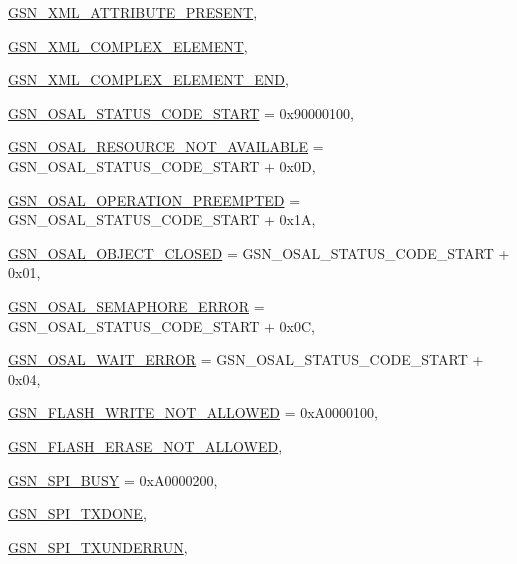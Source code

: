 \begin{DoxyCompactItemize}
\par
\hyperlink{a00659_gga476ae1caf992f8287176b2cc414c8707a73f0a3dccf9843f14a74761932fd6932}{GSN\_\-XML\_\-ATTRIBUTE\_\-PRESENT}, 
\par
\hyperlink{a00659_gga476ae1caf992f8287176b2cc414c8707a67b0a2de82e6b35ba5177aecd7a2f9fb}{GSN\_\-XML\_\-COMPLEX\_\-ELEMENT}, 
\par
\hyperlink{a00659_gga476ae1caf992f8287176b2cc414c8707a03fb9d27f1ba83873fd20c3248c1da65}{GSN\_\-XML\_\-COMPLEX\_\-ELEMENT\_\-END}, 
\par
\hyperlink{a00659_gga476ae1caf992f8287176b2cc414c8707a77edf0492ca255a3ab7158e082d5cac9}{GSN\_\-OSAL\_\-STATUS\_\-CODE\_\-START} =  0x90000100, 
\par
\hyperlink{a00659_gga476ae1caf992f8287176b2cc414c8707abf5c8b05a529fac33b93e5716054d2e3}{GSN\_\-OSAL\_\-RESOURCE\_\-NOT\_\-AVAILABLE} =  GSN\_\-OSAL\_\-STATUS\_\-CODE\_\-START + 0x0D, 
\par
\hyperlink{a00659_gga476ae1caf992f8287176b2cc414c8707a2f265a93e157558b25a4247a22b9eb45}{GSN\_\-OSAL\_\-OPERATION\_\-PREEMPTED} =  GSN\_\-OSAL\_\-STATUS\_\-CODE\_\-START + 0x1A, 
\par
\hyperlink{a00659_gga476ae1caf992f8287176b2cc414c8707a8c382363ca44bf1579bc072a6b16ea69}{GSN\_\-OSAL\_\-OBJECT\_\-CLOSED} =  GSN\_\-OSAL\_\-STATUS\_\-CODE\_\-START + 0x01, 
\par
\hyperlink{a00659_gga476ae1caf992f8287176b2cc414c8707a0172fcec91604abac7da9a4da9acb827}{GSN\_\-OSAL\_\-SEMAPHORE\_\-ERROR} =  GSN\_\-OSAL\_\-STATUS\_\-CODE\_\-START + 0x0C, 
\par
\hyperlink{a00659_gga476ae1caf992f8287176b2cc414c8707a4372275b7acc4c09a807c107819a87c0}{GSN\_\-OSAL\_\-WAIT\_\-ERROR} =  GSN\_\-OSAL\_\-STATUS\_\-CODE\_\-START + 0x04, 
\par
\hyperlink{a00659_gga476ae1caf992f8287176b2cc414c8707a1b812b67c4e93506fb34b25d01fa3a7d}{GSN\_\-FLASH\_\-WRITE\_\-NOT\_\-ALLOWED} =  0xA0000100, 
\par
\hyperlink{a00659_gga476ae1caf992f8287176b2cc414c8707a71daf09c6c80f9f705611efd5ab8decd}{GSN\_\-FLASH\_\-ERASE\_\-NOT\_\-ALLOWED}, 
\par
\hyperlink{a00659_gga476ae1caf992f8287176b2cc414c8707ab38cfabb3bb4d30421e9116b1e6c0b6d}{GSN\_\-SPI\_\-BUSY} =  0xA0000200, 
\par
\hyperlink{a00659_gga476ae1caf992f8287176b2cc414c8707af46c15379661c98701c00ce5acb4b116}{GSN\_\-SPI\_\-TXDONE}, 
\par
\hyperlink{a00659_gga476ae1caf992f8287176b2cc414c8707a3cfe27cbe2005a1d8ddf6156eaeb4312}{GSN\_\-SPI\_\-TXUNDERRUN}, 

\end{DoxyCompactItemize}
